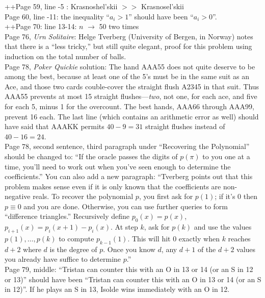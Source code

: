 \documentclass[11pt]{article}
\begin{document}
++Page 59, line -5 :  Krasnoshel'skii $>>$ Krasnosel'skii \\

Page 60, line -11: the inequality ``$a_i>1$'' should have been ``$a_i>0$''.\\

++Page 70: line 13-14: $n$ $\to$ 50 two times\\ 

Page 76, {\em Urn Solitaire}: Helge Tverberg (University of Bergen, in Norway) notes
that there is a ``less tricky,'' but still quite elegant, proof for this problem using
induction on the total number of balls.\\

Page 78, {\em Poker Quickie} solution:  The hand AAA55 does not quite deserve to be among
the best, because at least one of the 5's must be in the same suit as an Ace, and those two cards
couble-cover the straight flush A2345 in that suit.  Thus AAA55 prevents at most 15 straight
flushes---{\em two}, not one, for each ace, and five for each 5, minus 1 for the overcount.
The best hands, AAA66 through AAA99, prevent 16 each.  The last line (which contains an arithmetic
error as well) should have said that AAAKK permits $40 - 9 = 31$ straight flushes instead of $40 - 16 = 24$. \\

Page 78, second sentence, third paragraph under ``Recovering the Polynomial'' should be changed to:
``If the oracle passes the digits of $p(\pi)$ to you one at a time, you'll need to work out when
you've seen enough to determine the coefficients.''  You can also add a new paragraph:
``Tverberg points out that this
problem makes sense even if it is only known that the coefficients are non-negative
reals.  To recover the polynomial $p$, you first ask for $p(1)$; if it's 0 then
$p \equiv 0$ and you are done.  Otherwise, you can use further queries to
form ``difference triangles.''  Recursively define $p_0(x) = p(x)$, $p_{i+1}(x) =
p_i(x{+}1)-p_i(x)$.  At step $k$, ask for $p(k)$ and use the values $p(1),\dots,p(k)$
to compute $p_{k-1}(1)$.  This will hit 0 exactly when $k$ reaches $d{+}2$ where $d$ is the degree
of $p$. Once you know $d$, any $d{+}1$ of the $d{+}2$ values you already have suffice to
determine $p$.''\\

Page 79, middle:  ``Tristan can counter this with an O in 13 or 14 (or an S in 12 or 13)'' should
have been ``Tristan can counter this with an O in 13 or 14 (or an S in 12)''.  If he plays an S in 13,
Isolde wins immediately with an O in 12.\\
\end{document}
